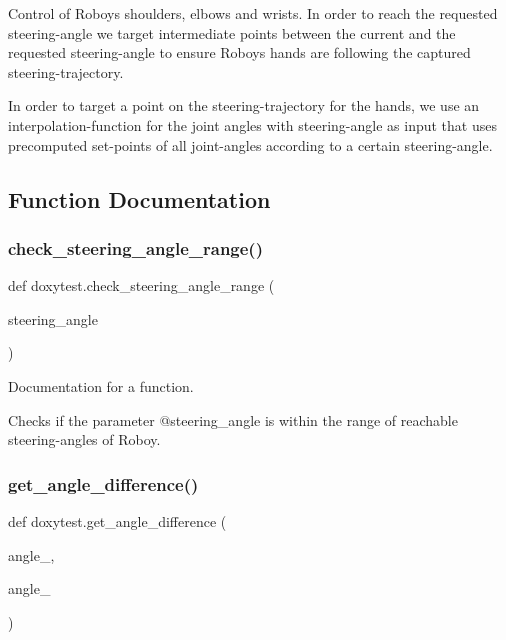 Control of Roboys\textquotesingle{} shoulders, elbows and wrists. In order to reach the requested steering-\/angle we target intermediate points between the current and the requested steering-\/angle to ensure Roboys\textquotesingle{} hands are following the captured steering-\/trajectory.

In order to target a point on the steering-\/trajectory for the hands, we use an interpolation-\/function for the joint angles with steering-\/angle as input that uses precomputed set-\/points of all joint-\/angles according to a certain steering-\/angle. 

\subsection{Function Documentation}
\mbox{\label{namespacedoxytest_a94c5d66f4c2b1ea971d87139216ee0d8}} 
\subsubsection{\texorpdfstring{check\_steering\_angle\_range()}{check\_steering\_angle\_range()}}
{\footnotesize\ttfamily def doxytest.\+check\+\_\+steering\+\_\+angle\+\_\+range (\begin{DoxyParamCaption}\item[{}]{steering\+\_\+angle }\end{DoxyParamCaption})}



Documentation for a function. 

Checks if the parameter @steering\+\_\+angle is within the range of reachable steering-\/angles of Roboy. \mbox{\label{namespacedoxytest_aa52bf7bd569ae4aea6835e191e3568cc}} 
\subsubsection{\texorpdfstring{get\_angle\_difference()}{get\_angle\_difference()}}
{\footnotesize\ttfamily def doxytest.\+get\+\_\+angle\+\_\+difference (\begin{DoxyParamCaption}\item[{}]{angle\+\_,  }\item[{}]{angle\+\_ }\end{DoxyParamCaption})}



